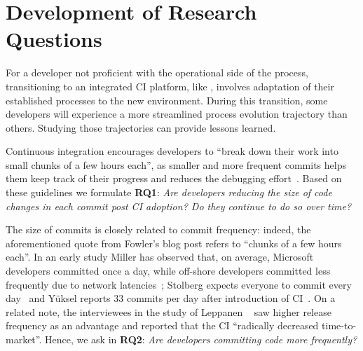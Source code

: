 
\section{Development of Research Questions}
\label{sec:background}

For a developer not proficient with the operational side of the process, 
transitioning to an integrated CI platform, like \Tvis, involves adaptation 
of their established processes to the new environment. 
During this transition, some developers will experience a more streamlined 
process evolution trajectory than others. 
Studying those trajectories can provide lessons learned.


%

Continuous integration encourages developers to ``break down their work 
into small chunks of a few hours each'', as smaller and more frequent commits 
helps them keep track of their progress and reduces the debugging effort~\cite{Fowler,Duvall}. 
Based on these guidelines we formulate \textbf{RQ1}: 
\emph{Are developers reducing the size of code changes in each commit 
post CI adoption? 
Do they continue to do so over time?}

The size of commits is closely related to commit frequency: indeed, the 
aforementioned quote from Fowler's blog post refers to ``chunks of a few hours each''. 
In an early study Miller has observed that, on average, Microsoft developers 
committed once a day, while off-shore developers committed less frequently 
due to network latencies~\cite{Miller}; Stolberg expects everyone to commit every 
day~\cite{Stolberg} and Y\"{u}ksel reports 33 commits per day after introduction 
of CI~\cite{Yuksel}. On a related note, the interviewees in the study of 
Leppanen \etal~\cite{Leppanen2015} saw higher release frequency as an
advantage and reported that the CI ``radically decreased time-to-market''. 
Hence, we ask in \textbf{RQ2}: 
\emph{Are developers committing code more frequently?}

